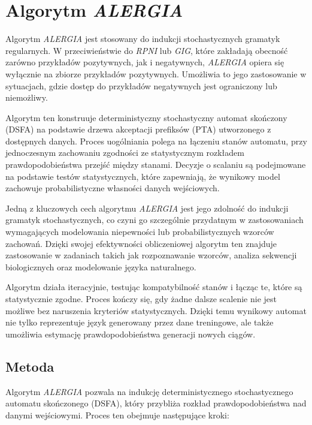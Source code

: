 \section{Algorytm \textit{ALERGIA}}  
\label{sec:alergia}  

Algorytm \textit{ALERGIA} \cite{ALERGIA} jest stosowany do indukcji stochastycznych gramatyk regularnych. W przeciwieństwie do \textit{RPNI} lub \textit{GIG}, które zakładają obecność zarówno przykładów pozytywnych, jak i negatywnych, \textit{ALERGIA} opiera się wyłącznie na zbiorze przykładów pozytywnych. Umożliwia to jego zastosowanie w sytuacjach, gdzie dostęp do przykładów negatywnych jest ograniczony lub niemożliwy.  

Algorytm ten konstruuje deterministyczny stochastyczny automat skończony (DSFA) na podstawie drzewa akceptacji prefiksów (PTA) utworzonego z dostępnych danych. Proces uogólniania polega na łączeniu stanów automatu, przy jednoczesnym zachowaniu zgodności ze statystycznym rozkładem prawdopodobieństwa przejść między stanami. Decyzje o scalaniu są podejmowane na podstawie testów statystycznych, które zapewniają, że wynikowy model zachowuje probabilistyczne własności danych wejściowych.  

Jedną z kluczowych cech algorytmu \textit{ALERGIA} jest jego zdolność do indukcji gramatyk stochastycznych, co czyni go szczególnie przydatnym w zastosowaniach wymagających modelowania niepewności lub probabilistycznych wzorców zachowań. Dzięki swojej efektywności obliczeniowej algorytm ten znajduje zastosowanie w zadaniach takich jak rozpoznawanie wzorców, analiza sekwencji biologicznych oraz modelowanie języka naturalnego.

Algorytm działa iteracyjnie, testując kompatybilność stanów i łącząc te, które są statystycznie zgodne. Proces kończy się, gdy żadne dalsze scalenie nie jest możliwe bez naruszenia kryteriów statystycznych. Dzięki temu wynikowy automat nie tylko reprezentuje język generowany przez dane treningowe, ale także umożliwia estymację prawdopodobieństwa generacji nowych ciągów.


\subsection{Metoda}  
Algorytm \textit{ALERGIA} pozwala na indukcję deterministycznego stochastycznego automatu skończonego (DSFA), który przybliża rozkład prawdopodobieństwa nad danymi wejściowymi. Proces ten obejmuje następujące kroki:  

